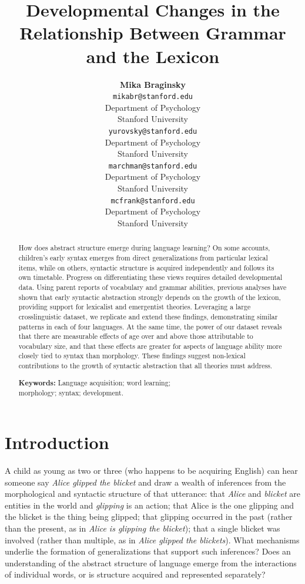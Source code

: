 \documentclass[10pt,letterpaper]{article}
\title{Developmental Changes in the Relationship Between Grammar and the Lexicon}
\author{{\large \bf Mika Braginsky} \\
  \texttt{mikabr@stanford.edu} \\
  Department of Psychology \\
  Stanford University
  \And {\large \bf Daniel Yurovsky} \\
  \texttt{yurovsky@stanford.edu} \\
  Department of Psychology \\
  Stanford University
    \And {\large \bf Virginia A. Marchman} \\
    \texttt{marchman@stanford.edu} \\
  Department of Psychology \\
  Stanford University
    \And {\large \bf Michael C. Frank}\\
    \texttt{mcfrank@stanford.edu} \\
  Department of Psychology \\
  Stanford University}
\begin{document}
\maketitle

\begin{abstract}

How does abstract structure emerge during language learning? On some accounts, children's early syntax emerges from direct generalizations from particular lexical items, while on others, syntactic structure is acquired independently and follows its own timetable. Progress on differentiating these views requires detailed developmental data. Using parent reports of vocabulary and grammar abilities, previous analyses have shown that early syntactic abstraction strongly depends on the growth of the lexicon, providing support for lexicalist and emergentist theories. Leveraging a large crosslinguistic dataset, we replicate and extend these findings, demonstrating similar patterns in each of four languages. At the same time, the power of our dataset reveals that there are measurable effects of age over and above those attributable to vocabulary size, and that these effects are greater for aspects of language ability more closely tied to syntax than morphology. These findings suggest non-lexical contributions to the growth of syntactic abstraction that all theories must address.

\textbf{Keywords:} 
Language acquisition; word learning; \\morphology; syntax; development.
\end{abstract}

\section{Introduction}

A child as young as two or three (who happens to be acquiring English) can hear someone say \emph{Alice glipped the blicket} and draw a wealth of inferences from the morphological and syntactic structure of that utterance: that \emph{Alice} and \emph{blicket} are entities in the world and \emph{glipping} is an action; that Alice is the one glipping and the blicket is the thing being glipped; that glipping occurred in the past (rather than the present, as in \emph{Alice is glipping the blicket}); that a single blicket was involved (rather than multiple, as in \emph{Alice glipped the blickets}). What mechanisms underlie the formation of generalizations that support such inferences? Does an understanding of the abstract structure of language emerge from the interactions of individual words, or is structure acquired and represented separately?
\end{document}
